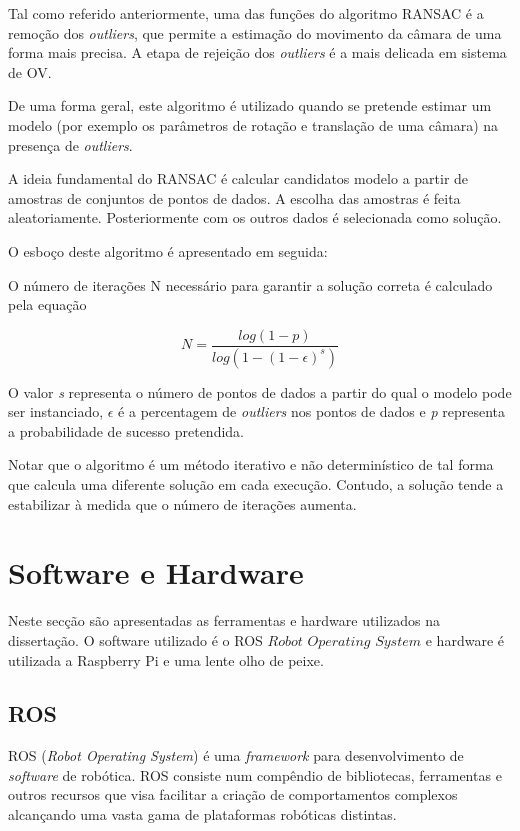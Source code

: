 Tal como referido anteriormente, uma das funções do algoritmo RANSAC é a remoção dos \textit{outliers}, que permite a estimação do movimento da câmara de uma forma mais precisa. A etapa de rejeição dos \textit{outliers} é a mais delicada em sistema de OV.

De uma forma geral, este algoritmo é utilizado quando se pretende estimar um modelo (por exemplo os parâmetros de rotação e translação de uma câmara) na presença de \textit{outliers}.

A ideia fundamental do RANSAC é calcular candidatos modelo a partir de amostras de conjuntos de pontos de dados. A escolha das amostras é feita aleatoriamente. Posteriormente com os outros dados é selecionada como solução.

O esboço deste algoritmo é apresentado em seguida:


O número de iterações N necessário para garantir a solução correta é calculado pela equação

\[  N = \frac{log(1-p)}{log(1-(1-\epsilon)^s)} \]

O valor \textit{s} representa o número de pontos de dados a partir do qual o modelo pode ser instanciado, $\epsilon$ é a percentagem de \textit{outliers} nos pontos de dados e \textit{p} representa a probabilidade de sucesso pretendida.

Notar que o algoritmo é um método iterativo e não determinístico de tal forma que calcula uma diferente solução em cada execução. Contudo, a solução tende a estabilizar à medida que o número de iterações aumenta.




\section{Software e Hardware} \label{sec:ferSof}

Neste secção são apresentadas as ferramentas e hardware utilizados na dissertação. O software utilizado é o ROS \textit{$Robot$} \textit{$Operating$} \textit{$System$} e hardware é utilizada a Raspberry Pi e uma lente olho de peixe.

\subsection{ROS}

ROS (\textit{Robot Operating System}) é uma \textit{framework} para desenvolvimento de \textit{software} de robótica. ROS consiste num compêndio de bibliotecas, ferramentas e outros recursos que visa facilitar a criação de comportamentos complexos alcançando uma vasta gama de plataformas robóticas distintas. 

